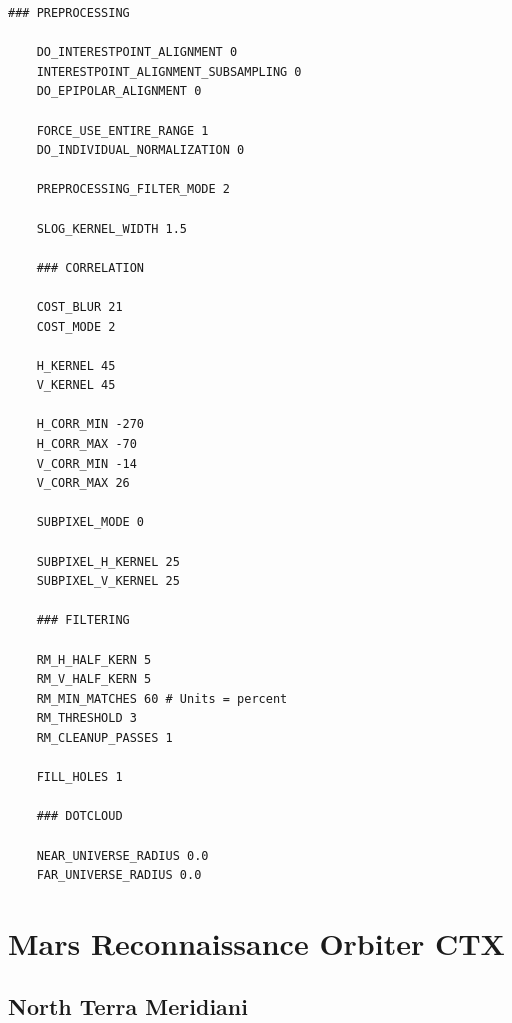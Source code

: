 \begin{center}\begin{minipage}{5.5in}
\begin{Verbatim}[frame=single,fontsize=\small,label=stereo.default for HiRISE North Terra Meridiani Crop]
    ### PREPROCESSING

    DO_INTERESTPOINT_ALIGNMENT 0
    INTERESTPOINT_ALIGNMENT_SUBSAMPLING 0
    DO_EPIPOLAR_ALIGNMENT 0

    FORCE_USE_ENTIRE_RANGE 1
    DO_INDIVIDUAL_NORMALIZATION 0

    PREPROCESSING_FILTER_MODE 2

    SLOG_KERNEL_WIDTH 1.5

    ### CORRELATION

    COST_BLUR 21
    COST_MODE 2

    H_KERNEL 45
    V_KERNEL 45

    H_CORR_MIN -270
    H_CORR_MAX -70
    V_CORR_MIN -14
    V_CORR_MAX 26

    SUBPIXEL_MODE 0

    SUBPIXEL_H_KERNEL 25
    SUBPIXEL_V_KERNEL 25

    ### FILTERING

    RM_H_HALF_KERN 5
    RM_V_HALF_KERN 5
    RM_MIN_MATCHES 60 # Units = percent
    RM_THRESHOLD 3
    RM_CLEANUP_PASSES 1

    FILL_HOLES 1

    ### DOTCLOUD

    NEAR_UNIVERSE_RADIUS 0.0
    FAR_UNIVERSE_RADIUS 0.0
\end{Verbatim}
\end{minipage}\end{center}

\vfill

\section{Mars Reconnaissance Orbiter CTX}

\subsection{North Terra Meridiani}

